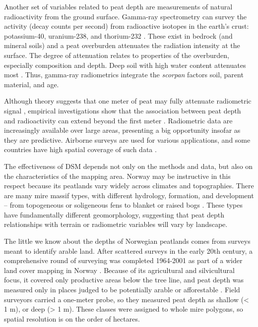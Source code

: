 \documentclass[soil, manuscript]{copernicus}
\begin{document}
Another set of variables related to peat depth are measurements of natural radioactivity from the ground surface.
Gamma-ray spectrometry can survey the activity (decay counts per second) from radioactive isotopes in the earth's crust: potassium-40, uranium-238, and thorium-232 \citep{reinhardtGammaraySpectrometryVersatile2019}.
These exist in bedrock (and mineral soils) and a peat overburden attenuates the radiation intensity at the surface.
The degree of attenuation relates to properties of the overburden, especially composition and depth.
Deep soil with high water content attenuates most \citep{beamishGammaRayAttenuation2013, reinhardtGammaraySpectrometryVersatile2019}.
Thus, gamma-ray radiometrics integrate the \emph{scorpan} factors soil, parent material, and age.

Although theory suggests that one meter of peat may fully attenuate radiometric signal \citep{beamishGammaRayAttenuation2013, reinhardtGammaraySpectrometryVersatile2019}, empirical investigations show that the association between peat depth and radioactivity can extend beyond the first meter \citep{keaneySpatialStatisticsEstimate2013, gatisMappingUplandPeat2019, kogantiMappingPeatDepth2023}.
Radiometric data are increasingly available over large areas, presenting a big opportunity insofar as they are predictive.
Airborne surveys are used for various applications, and some countries have high spatial coverage of such data \citep{minasnyDigitalMappingPeatlands2019, baranwalAirborneGeophysicalSurveys2020}.

The effectiveness of DSM depends not only on the methods and data, but also on the characteristics of the mapping area.
Norway may be instructive in this respect because its peatlands vary widely across climates and topographies. There are many mire massif types, with different hydrology, formation, and development -- from topogeneous or soligeneous fens to blanket or raised bogs \citep{lyngstadBeskrivelserAvTorvmassivenheter2023}.
These types have fundamentally different geomorphology, suggesting that peat depth relationships with terrain or radiometric variables will vary by landscape.

The little we know about the depths of Norwegian peatlands comes from surveys meant to identify arable land.
After scattered surveys in the early 20th century, a comprehensive round of surveying was completed 1964-2001 as part of a wider land cover mapping in Norway \citep{bjordalMarkslagsklassifikasjonOkonomiskKartverk2007}.
Because of its agricultural and silvicultural focus, it covered only productive areas below the tree line, and peat depth was measured only in places judged to be potentially arable or afforestable \citep{ahlstromAR5Klassifikasjonssystem2019}.
Field surveyors carried a one-meter probe, so they measured peat depth as shallow (\textless{} 1 m), or deep (\textgreater{} 1 m).
These classes were assigned to whole mire polygons, so spatial resolution is on the order of hectares.
\end{document}
